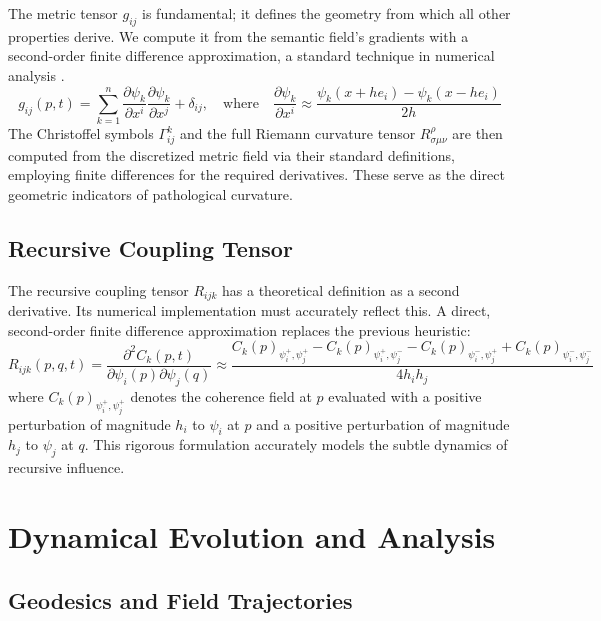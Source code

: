 The metric tensor \(g_{ij}\) is fundamental; it defines the geometry from which all other properties derive. We compute it from the semantic field's gradients with a second-order finite difference approximation, a standard technique in numerical analysis \autocite{BurdenFairesBurden2015}.
\begin{equation}
g_{ij}(p,t) = \sum_{k=1}^n \frac{\partial \psi_k}{\partial x^i} \frac{\partial \psi_k}{\partial x^j} + \delta_{ij}, \quad \text{where} \quad \frac{\partial \psi_k}{\partial x^i} \approx \frac{\psi_k(x + h e_i) - \psi_k(x - h e_i)}{2h}
\end{equation}
The Christoffel symbols \(\Gamma^k_{ij}\) and the full Riemann curvature tensor \(R^{\rho}_{\sigma\mu\nu}\) are then computed from the discretized metric field via their standard definitions, employing finite differences for the required derivatives. These serve as the direct geometric indicators of pathological curvature.

\subsection{Recursive Coupling Tensor}

The recursive coupling tensor \(R_{ijk}\) has a theoretical definition as a second derivative. Its numerical implementation must accurately reflect this. A direct, second-order finite difference approximation replaces the previous heuristic:
\begin{equation}
R_{ijk}(p,q,t) = \frac{\partial^2 C_k(p,t)}{\partial \psi_i(p) \partial \psi_j(q)} \approx \frac{C_k(p)_{\psi_i^+,\psi_j^+} - C_k(p)_{\psi_i^+,\psi_j^-} - C_k(p)_{\psi_i^-,\psi_j^+} + C_k(p)_{\psi_i^-,\psi_j^-}}{4h_i h_j}
\end{equation}
where \(C_k(p)_{\psi_i^+,\psi_j^+}\) denotes the coherence field at \(p\) evaluated with a positive perturbation of magnitude \(h_i\) to \(\psi_i\) at \(p\) and a positive perturbation of magnitude \(h_j\) to \(\psi_j\) at \(q\). This rigorous formulation accurately models the subtle dynamics of recursive influence.

\section{Dynamical Evolution and Analysis}

\subsection{Geodesics and Field Trajectories}


